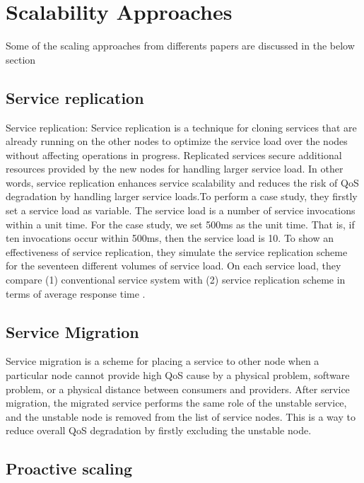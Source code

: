 \chapter{Scalability Approaches}
\label{ch:Scalability Approaches}

Some of the scaling approaches from differents papers are discussed in the below section

\section{Service replication}
Service replication: Service replication is a technique for cloning services that are already running on the other nodes to optimize the service load over the nodes without affecting operations in progress. Replicated services secure additional resources provided by the new nodes for handling larger service load. In other words, service replication enhances service scalability and reduces the risk of QoS degradation by handling larger service loads.To perform a case study, they firstly set a service load as variable. The service load is a number of service invocations within a unit time. For the case study, we set 500ms as the unit time. That is, if ten invocations occur within 500ms, then the service load is 10. To show an effectiveness of service replication, they simulate the service replication scheme for the seventeen different volumes of service load. On each service load, they compare (1) conventional service system with (2) service replication scheme in terms of average response time
\cite{falatah_cloud_2014}.

\section{Service Migration}

Service migration is a scheme for placing a service to other node when a particular node cannot provide high QoS cause by a physical problem, software problem, or a physical distance between consumers and providers. After service migration, the migrated service performs the same role of the unstable service, and the unstable node is removed from the list of service nodes. This is a way to reduce overall QoS degradation by firstly excluding the unstable node\cite{lee_software_2010}.


\section{Proactive scaling}

